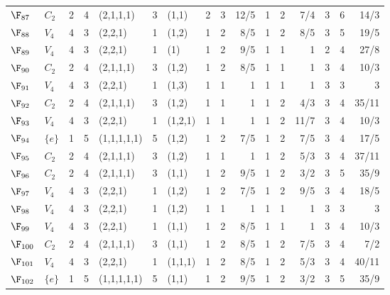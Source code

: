 \begin{landscape}
{\begin{longtable}{@{}l l r r l r l rrr rrr rrr@{}}
\addlinespace[3pt]
\textbf{$\F_{87}$} & $C_{2}$ & 2 & 4 & (2,1,1,1) & 3 & (1,1) & 2 & 3 & 12/5 & 1 & 2 & 7/4 & 3 & 6 & 14/3 \\
\addlinespace[3pt]
\textbf{$\F_{88}$} & $V_{4}$ & 4 & 3 & (2,2,1) & 1 & (1,2) & 1 & 2 & 8/5 & 1 & 2 & 8/5 & 3 & 5 & 19/5 \\
\addlinespace[3pt]
\textbf{$\F_{89}$} & $V_{4}$ & 4 & 3 & (2,2,1) & 1 & (1) & 1 & 2 & 9/5 & 1 & 1 & 1 & 2 & 4 & 27/8 \\
\addlinespace[3pt]
\textbf{$\F_{90}$} & $C_{2}$ & 2 & 4 & (2,1,1,1) & 3 & (1,2) & 1 & 2 & 8/5 & 1 & 1 & 1 & 3 & 4 & 10/3 \\
\addlinespace[3pt]
\textbf{$\F_{91}$} & $V_{4}$ & 4 & 3 & (2,2,1) & 1 & (1,3) & 1 & 1 & 1 & 1 & 1 & 1 & 3 & 3 & 3 \\
\addlinespace[3pt]
\textbf{$\F_{92}$} & $C_{2}$ & 2 & 4 & (2,1,1,1) & 3 & (1,2) & 1 & 1 & 1 & 1 & 2 & 4/3 & 3 & 4 & 35/11 \\
\addlinespace[3pt]
\textbf{$\F_{93}$} & $V_{4}$ & 4 & 3 & (2,2,1) & 1 & (1,2,1) & 1 & 1 & 1 & 1 & 2 & 11/7 & 3 & 4 & 10/3 \\
\addlinespace[3pt]
\textbf{$\F_{94}$} & $\{e\}$ & 1 & 5 & (1,1,1,1,1) & 5 & (1,2) & 1 & 2 & 7/5 & 1 & 2 & 7/5 & 3 & 4 & 17/5 \\
\addlinespace[3pt]
\textbf{$\F_{95}$} & $C_{2}$ & 2 & 4 & (2,1,1,1) & 3 & (1,2) & 1 & 1 & 1 & 1 & 2 & 5/3 & 3 & 4 & 37/11 \\
\addlinespace[3pt]
\textbf{$\F_{96}$} & $C_{2}$ & 2 & 4 & (2,1,1,1) & 3 & (1,1) & 1 & 2 & 9/5 & 1 & 2 & 3/2 & 3 & 5 & 35/9 \\
\addlinespace[3pt]
\textbf{$\F_{97}$} & $V_{4}$ & 4 & 3 & (2,2,1) & 1 & (1,2) & 1 & 2 & 7/5 & 1 & 2 & 9/5 & 3 & 4 & 18/5 \\
\addlinespace[3pt]
\textbf{$\F_{98}$} & $V_{4}$ & 4 & 3 & (2,2,1) & 1 & (1,2) & 1 & 1 & 1 & 1 & 1 & 1 & 3 & 3 & 3 \\
\addlinespace[3pt]
\textbf{$\F_{99}$} & $V_{4}$ & 4 & 3 & (2,2,1) & 1 & (1,1) & 1 & 2 & 8/5 & 1 & 1 & 1 & 3 & 4 & 10/3 \\
\addlinespace[3pt]
\textbf{$\F_{100}$} & $C_{2}$ & 2 & 4 & (2,1,1,1) & 3 & (1,1) & 1 & 2 & 8/5 & 1 & 2 & 7/5 & 3 & 4 & 7/2 \\
\addlinespace[3pt]
\textbf{$\F_{101}$} & $V_{4}$ & 4 & 3 & (2,2,1) & 1 & (1,1,1) & 1 & 2 & 8/5 & 1 & 2 & 5/3 & 3 & 4 & 40/11 \\
\addlinespace[3pt]
\textbf{$\F_{102}$} & $\{e\}$ & 1 & 5 & (1,1,1,1,1) & 5 & (1,1) & 1 & 2 & 9/5 & 1 & 2 & 3/2 & 3 & 5 & 35/9 \\

\end{longtable}}
\end{landscape}
